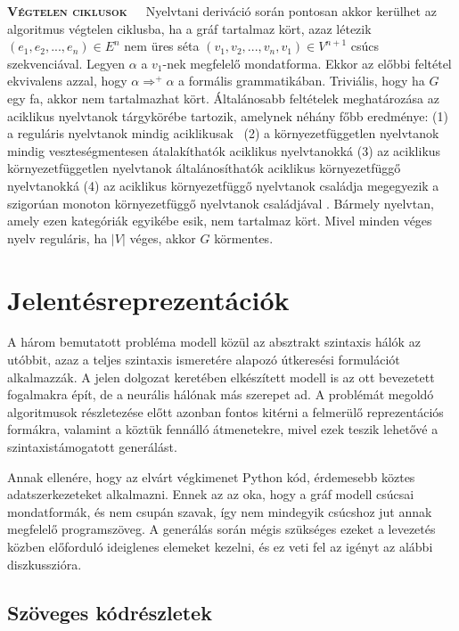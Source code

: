 \documentclass[twoside, 12pt]{report}
\begin{document}
\textbf{\textsc{Végtelen ciklusok}}\ \ \ Nyelvtani deriváció során pontosan akkor kerülhet az algoritmus végtelen ciklusba, ha a gráf tartalmaz kört, azaz létezik $(e_{1}, e_{2}, ..., e_{n}) \in E^{n}$ nem üres séta $(v_{1}, v_{2}, ..., v_{n}, v_{1}) \in V^{n+1}$ csúcs szekvenciával. Legyen $\alpha$ a $v_{1}$-nek megfelelő mondatforma. Ekkor az előbbi feltétel ekvivalens azzal, hogy $\alpha \Rightarrow^{+} \alpha$ a formális grammatikában. Triviális, hogy ha $G$ egy fa, akkor nem tartalmazhat kört. Általánosabb feltételek meghatározása az aciklikus nyelvtanok tárgykörébe tartozik, amelynek néhány főbb eredménye: (1) a reguláris nyelvtanok mindig aciklikusak\footnotemark{} \ (2) a környezetfüggetlen nyelvtanok mindig veszteségmentesen átalakíthatók aciklikus nyelvtanokká \parencite{Aar92a} (3) az aciklikus környezetfüggetlen nyelvtanok általánosíthatók aciklikus környezetfüggő nyelvtanokká \parencite{Aar92a} (4) az aciklikus környezetfüggő nyelvtanok családja megegyezik a szigorúan monoton környezetfüggő nyelvtanok családjával \parencite{NW01a}. Bármely nyelvtan, amely ezen kategóriák egyikébe esik, nem tartalmaz kört. Mivel minden véges nyelv reguláris, ha $|V|$ véges, akkor $G$ körmentes.


\section{Jelentésreprezentációk}

A három bemutatott probléma modell közül az absztrakt szintaxis hálók az utóbbit, azaz a teljes szintaxis ismeretére alapozó útkeresési formulációt alkalmazzák. A jelen dolgozat keretében elkészített modell is az ott bevezetett fogalmakra épít, de a neurális hálónak más szerepet ad. A problémát megoldó algoritmusok részletezése előtt azonban fontos kitérni a felmerülő reprezentációs formákra, valamint a köztük fennálló átmenetekre, mivel ezek teszik lehetővé a szintaxistámogatott generálást.

Annak ellenére, hogy az elvárt végkimenet Python kód, érdemesebb köztes adatszerkezeteket alkalmazni. Ennek az az oka, hogy a gráf modell csúcsai mondatformák, és nem csupán szavak, így nem mindegyik csúcshoz jut annak megfelelő programszöveg. A generálás során mégis szükséges ezeket a levezetés közben előforduló ideiglenes elemeket kezelni, és ez veti fel az igényt az alábbi diszkusszióra.

\subsection{Szöveges kódrészletek}
\end{document}
